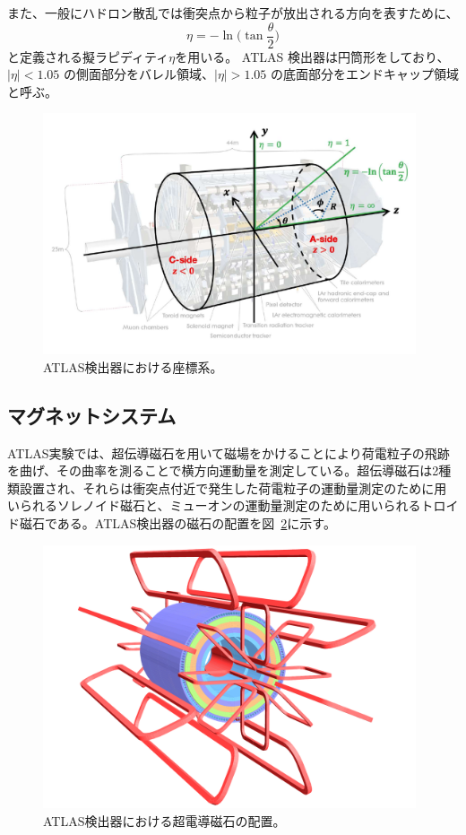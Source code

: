 また、一般にハドロン散乱では衝突点から粒子が放出される方向を表すために、
\begin{equation}
    \eta=-\ln\bigg(\tan\frac{\theta}{2}\bigg)
    \label{ラピディティ}
\end{equation}
と定義される擬ラピディティ$\eta$を用いる。
ATLAS 検出器は円筒形をしており、$|\eta| < 1.05$ の側面部分をバレル領域、$|\eta| > 1.05$ の底面部分をエンドキャップ領域と呼ぶ。

\begin{figure}[tb]
  \centering
  \includegraphics[clip, width=11cm]{fig/2/coordinate.pdf}
  \caption{ATLAS検出器における座標系。}
  \label{fig:2-5}
\end{figure}

\newpage
\subsection{マグネットシステム}\label{section2-2-2}
ATLAS実験では、超伝導磁石を用いて磁場をかけることにより荷電粒子の飛跡を曲げ、その曲率を測ることで横方向運動量を測定している。超伝導磁石は2種類設置され、それらは衝突点付近で発生した荷電粒子の運動量測定のために用いられるソレノイド磁石と、ミューオンの運動量測定のために用いられるトロイド磁石である。ATLAS検出器の磁石の配置を図~\ref{fig:2-6}に示す。

\begin{figure}[h]
  \centering
  \includegraphics[clip, width=11cm]{fig/2/ATLcoilGeom.pdf}
  \caption{ATLAS検出器における超電導磁石の配置。}
  \label{fig:2-6}
\end{figure}

